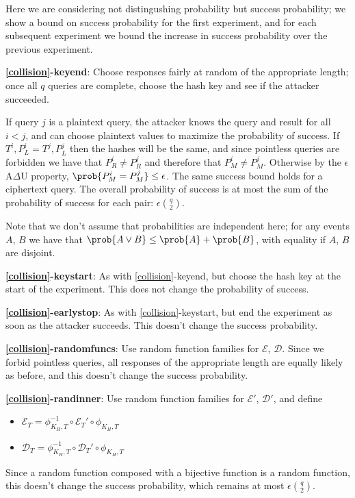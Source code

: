 \documentclass[journal=tosc,preprint,floatrow,submission]{iacrtrans}
\newcommand*{\xprm}[2]{\textsf{\ref*{#1}-#2}}
\newcommand*{\xprmtitle}[2]{\textbf{\xprm{#1}{#2}}}
\newcommand*{\calE}{\mathcal{E}}
\newcommand*{\calD}{\mathcal{D}}
\begin{document}
Here we are considering not distingushing probability but success probability; we
show a bound on success probability for the first experiment, and for each subsequent experiment
we bound the increase in success probability over the previous experiment.

\xprmtitle{collision}{keyend}: Choose responses fairly at random of the appropriate length;
once all $q$ queries are complete, choose the hash key and see if the attacker succeeded.

If query $j$ is a plaintext query, the attacker knows the query and result
for all $i < j$, and can choose plaintext values to maximize the probability of success.
If $T^i, P_L^i = T^j, P_L^j$ then the hashes will be the same, and since pointless
queries are forbidden we have that $P_R^i \neq P_R^j$ and therefore that
$P_M^i \neq P_M^j$. Otherwise by the $\epsilon$A$\Delta$U property,
$\prob{P_M^i = P_M^j} \leq \epsilon$. The same success bound holds for a ciphertext query.
The overall probability of success
is at most the sum of the probability of success for each pair:
$\epsilon\binom{q}{2}$.

Note that we don't assume that probabilities are independent here;
for any events $A$, $B$ we have that $\prob{A \vee B} \leq \prob{A} + \prob{B}$, with
equality if $A$, $B$ are disjoint.

\xprmtitle{collision}{keystart}: As with \xprm{collision}{keyend}, but
choose the hash key at the start of the experiment. This
does not change the probability of success.

\xprmtitle{collision}{earlystop}: As with \xprm{collision}{keystart}, but
end the experiment as soon as the attacker succeeds.
This doesn't change the success probability.

\xprmtitle{collision}{randomfuncs}: Use random function families for $\calE$,
$\calD$. Since we forbid pointless queries,
all responses of the appropriate length are equally likely as before,
and this doesn't change the success probability.

\xprmtitle{collision}{randinner}: Use random function families for $\calE'$, $\calD'$, and define
\begin{itemize}
    \item $\calE_T = \phi^{-1}_{K_H, T} \circ \calE_T' \circ \phi_{K_H, T}$
    \item $\calD_T = \phi^{-1}_{K_H, T} \circ \calD_T' \circ \phi_{K_H, T}$
\end{itemize}

Since a random function composed with a bijective function is a random function,
this doesn't change the success probability, which remains at most
$\epsilon\binom{q}{2}$.
\end{document}
